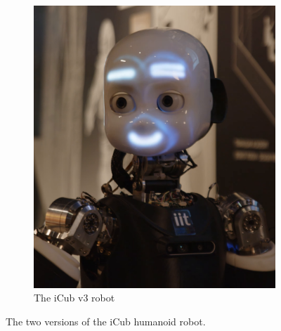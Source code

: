 \begin{figure}[tpb]
\begin{subfigure}[b]{0.48\textwidth}
        \includegraphics[width=\textwidth]{chapter_introduction/figures/iCubGenova09.png}
        \caption{The iCub v3 robot}
        \label{fig:iCubGenova09}
    \end{subfigure}
    \caption{The two versions of the iCub humanoid robot.}
	\label{fig:icub}
\end{figure}


